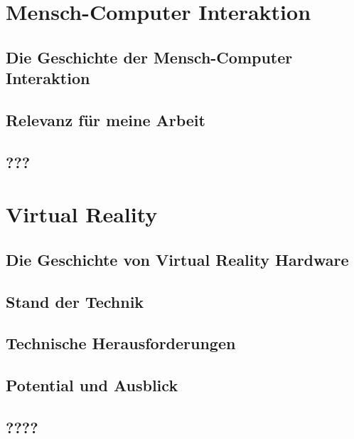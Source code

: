 \lipsum[2]

\section{Mensch-Computer Interaktion}\label{sec:HCI}

\lipsum[2]

\subsection{Die Geschichte der Mensch-Computer Interaktion}\label{sec:HCIGeschichte}

\lipsum[2]

\subsection{Relevanz für meine Arbeit}\label{sec:RelevanzHCI}

\lipsum[2]

\subsection{???}\label{sec:???}

\lipsum[2]

\section{Virtual Reality}\label{sec:VR}

\lipsum[2]

\subsection{Die Geschichte von Virtual Reality Hardware}\label{sec:VRGeschichte}

\lipsum[2]

\subsection{Stand der Technik}\label{sec:VRStandDerTechnik}

\lipsum[2]

\subsection{Technische Herausforderungen}\label{sec:VRHerausforderungen}
\lipsum[2]

\subsection{Potential und Ausblick}\label{sec:VRPotentialUndAusblick}

\lipsum[2]

\subsection{????}\label{sec:????}

\lipsum[2]

